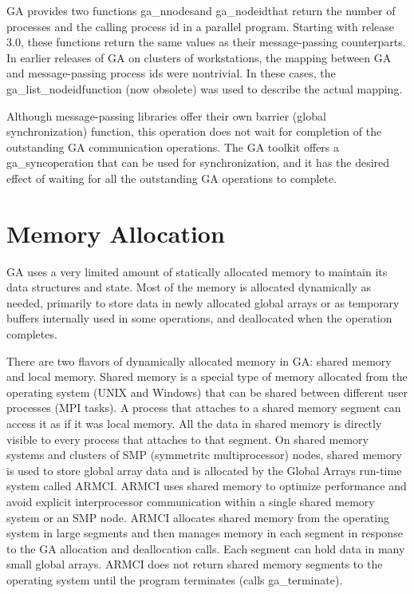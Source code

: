 GA provides two functions ga\_nnodesand ga\_nodeidthat return the
number of processes and the calling process id in a parallel program.
Starting with release 3.0, these functions return the same values
as their message-passing counterparts. In earlier releases of GA on
clusters of workstations, the mapping between GA and message-passing
process ids were nontrivial. In these cases, the ga\_list\_nodeidfunction
(now obsolete) was used to describe the actual mapping.

Although message-passing libraries offer their own barrier (global
synchronization) function, this operation does not wait for completion
of the outstanding GA communication operations. The GA toolkit offers
a ga\_syncoperation that can be used for synchronization, and it has
the desired effect of waiting for all the outstanding GA operations
to complete. 


\section{\label{sub:Memory-Allocation}Memory Allocation }

GA uses a very limited amount of statically allocated memory to maintain
its data structures and state. Most of the memory is allocated dynamically
as needed, primarily to store data in newly allocated global arrays
or as temporary buffers internally used in some operations, and deallocated
when the operation completes.

There are two flavors of dynamically allocated memory in GA: shared
memory and local memory. Shared memory is a special type of memory
allocated from the operating system (UNIX and Windows) that can be
shared between different user processes (MPI tasks). A process that
attaches to a shared memory segment can access it as if it was local
memory. All the data in shared memory is directly visible to every
process that attaches to that segment. On shared memory systems and
clusters of SMP (symmetritc multiprocessor) nodes, shared memory is
used to store global array data and is allocated by the Global Arrays
run-time system called ARMCI. ARMCI uses shared memory to optimize
performance and avoid explicit interprocessor communication within
a single shared memory system or an SMP node. ARMCI allocates shared
memory from the operating system in large segments and then manages
memory in each segment in response to the GA allocation and deallocation
calls. Each segment can hold data in many small global arrays. ARMCI
does not return shared memory segments to the operating system until
the program terminates (calls ga\_terminate).

